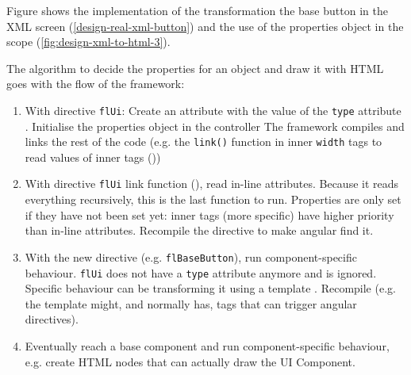 Figure  shows the implementation of the transformation the base button in the \ac{XML} screen (\ref{design-real-xml-button}) and the use of the properties object in the scope (\ref{fig:design-xml-to-html-3}).

The algorithm to decide the properties for an object and draw it with \ac{HTML} goes with the flow of the framework:
\begin{enumerate}
	\item With directive \texttt{flUi}: Create an attribute with the value of the \texttt{type} attribute . Initialise the properties object in the controller  The framework compiles and links the rest of the code (e.g. the \texttt{link()} function in inner \texttt{width} tags to read values of inner tags ())
	\item With directive \texttt{flUi} link function (), read in-line attributes. Because it reads everything recursively, this is the last function to run. Properties are only set if they have not been set yet: inner tags (more specific) have higher priority than in-line attributes. Recompile the directive to make angular find it. 
	\item With the new directive (e.g. \texttt{flBaseButton}), run component-specific behaviour. \texttt{flUi} does not have a \texttt{type} attribute anymore and is ignored. Specific behaviour can be transforming it using a template . Recompile (e.g. the template might, and normally has, tags that can trigger angular directives).
	\item Eventually reach a base component and run component-specific behaviour, e.g. create \ac{HTML} nodes that can actually draw the UI Component.
\end{enumerate}

